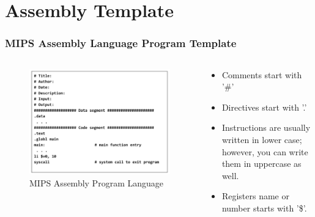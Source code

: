 \documentclass[
	11pt, %
	hmargin=1cm,vmargin=0cm,head=0.5cm,headsep=0pt,foot=0.5cm,margin=2cm
]{beamer}
\begin{document}
\section{Assembly Template}
\begin{frame}
	\frametitle{MIPS Assembly Language Program Template}
	
	\begin{columns}[c] %
		
		\begin{column}{0.5\textwidth} %
			\begin{figure}
				\includegraphics[width=0.9\linewidth]{mips_assembly_program_language.png}
				\caption{MIPS Assembly Program Language}
			\end{figure}
		\end{column}


		\begin{column}{0.5\textwidth} %
			\begin{itemize}
				\item Comments start with '\#' 
				\item Directives start with '.'
				\item Instructions are usually written in lower case; however, you can write them in uppercase as well.
				\item Registers name or number starts with '\$'.
			\end{itemize}
		\end{column}
	\end{columns}
\end{frame}
\end{document}
